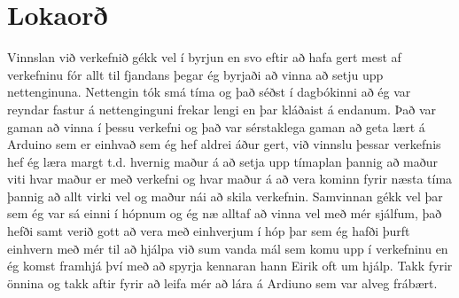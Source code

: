 \section{Lokaorð}
Vinnslan við verkefnið gékk vel í byrjun en svo eftir að hafa gert mest af verkefninu fór allt til fjandans þegar ég byrjaði að vinna að setju upp nettenginuna. Nettengin tók smá tíma og það séðst í dagbókinni að ég var reyndar fastur á nettenginguni frekar lengi en þar kláðaist á endanum. Það var gaman að vinna í þessu verkefni og það var sérstaklega gaman að geta lært á Arduino sem er einhvað sem ég hef aldrei áður gert, við vinnslu þessar verkefnis hef ég læra margt t.d. hvernig maður á að setja upp tímaplan þannig að maður viti hvar maður er með verkefni og hvar maður á að vera kominn fyrir næsta tíma þannig að allt virki vel og maður nái að skila verkefnin. Samvinnan gékk vel þar sem ég var sá einni í hópnum og ég næ alltaf að vinna vel með mér sjálfum, það hefði samt verið gott að vera með einhverjum í hóp þar sem ég hafði þurft einhvern með mér til að hjálpa við sum vanda mál sem komu upp í verkefninu en ég komst framhjá því með að spyrja kennaran hann Eirik oft um hjálp.
Takk fyrir önnina og takk aftir fyrir að leifa mér að lára á Ardiuno sem var alveg frábært. \cite{brock}